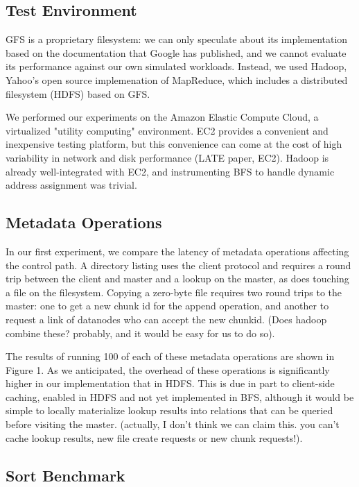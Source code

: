 \documentclass{article}
\begin{document}
\subsection{Test Environment}

GFS is a proprietary filesystem: we can only speculate about its implementation based on the documentation that Google has published, and we cannot evaluate its performance against our own simulated workloads.  Instead, we used Hadoop, Yahoo's open source implemenation of MapReduce, which includes a distributed filesystem (HDFS) based on GFS.

We performed our experiments on the Amazon Elastic Compute Cloud, a virtualized "utility computing" environment.  EC2 provides a convenient and inexpensive testing platform, but this convenience can come at the cost of high variability in network and disk performance (LATE paper, EC2).  Hadoop is already well-integrated with EC2, and instrumenting BFS to handle dynamic address assignment was trivial.

\subsection{Metadata Operations}

In our first experiment, we compare the latency of metadata operations affecting the control path.  A directory listing uses the client protocol and requires a round trip between the client and master and a lookup on the master, as does touching a file on the filesystem.  Copying a zero-byte file requires two round trips to the master: one to get a new chunk id for the append operation, and another to request a link of datanodes who can accept the new chunkid.  (Does hadoop combine these?  probably, and it would be easy for us to do so).

The results of running 100 of each of these metadata operations are shown in Figure 1.  As we anticipated, the overhead of these operations is significantly higher in our implementation that in HDFS.  This is due in part to client-side caching, enabled in HDFS and not yet implemented in BFS, although it would be simple to locally materialize lookup results into relations that can be queried before visiting the master. (actually, I don't think we can claim this.  you can't cache lookup results, new file create requests or new chunk requests!).

\subsection{Sort Benchmark}
\end{document}
